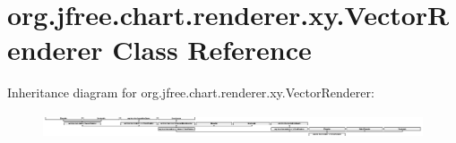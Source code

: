 \hypertarget{classorg_1_1jfree_1_1chart_1_1renderer_1_1xy_1_1_vector_renderer}{}\section{org.\+jfree.\+chart.\+renderer.\+xy.\+Vector\+Renderer Class Reference}
\label{classorg_1_1jfree_1_1chart_1_1renderer_1_1xy_1_1_vector_renderer}
Inheritance diagram for org.\+jfree.\+chart.\+renderer.\+xy.\+Vector\+Renderer\+:\begin{figure}[H]
\begin{center}
\leavevmode
\includegraphics[height=0.706625cm]{classorg_1_1jfree_1_1chart_1_1renderer_1_1xy_1_1_vector_renderer}
\end{center}
\end{figure}
